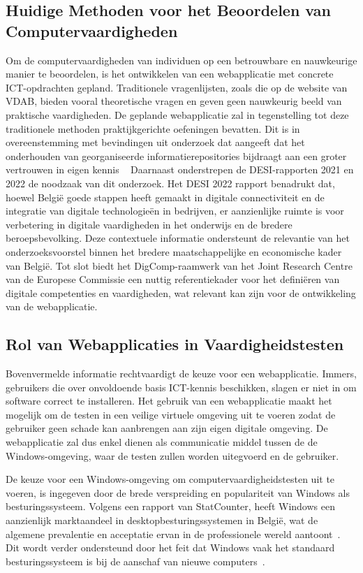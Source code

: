 \subsection{Huidige Methoden voor het Beoordelen van Computervaardigheden}
Om de computervaardigheden van individuen op een betrouwbare en nauwkeurige manier te beoordelen, is het ontwikkelen van een webapplicatie met concrete ICT-opdrachten gepland. Traditionele vragenlijsten, zoals die op de website van VDAB, bieden vooral theoretische vragen en geven geen nauwkeurig beeld van praktische vaardigheden.
De geplande webapplicatie zal in tegenstelling tot deze traditionele methoden praktijkgerichte oefeningen bevatten. Dit is in overeenstemming met bevindingen uit onderzoek dat aangeeft dat het onderhouden van georganiseerde informatierepositories bijdraagt aan een groter vertrouwen in eigen kennis ~\textcite{JudgingKnowledge}
Daarnaast onderstrepen de DESI-rapporten 2021 en 2022 de noodzaak van dit onderzoek. Het DESI 2022 rapport benadrukt dat, hoewel België goede stappen heeft gemaakt in digitale connectiviteit en de integratie van digitale technologieën in bedrijven, er aanzienlijke ruimte is voor verbetering in digitale vaardigheden in het onderwijs en de bredere beroepsbevolking. Deze contextuele informatie ondersteunt de relevantie van het onderzoeksvoorstel binnen het bredere maatschappelijke en economische kader van België.
Tot slot biedt het DigComp-raamwerk van het Joint Research Centre van de Europese Commissie een nuttig referentiekader voor het definiëren van digitale competenties en vaardigheden, wat relevant kan zijn voor de ontwikkeling van de webapplicatie. ~\textcite{DigCompFramework}

\subsection{Rol van Webapplicaties in Vaardigheidstesten}
Bovenvermelde informatie rechtvaardigt de ke\-uze voor een webapplicatie. Immers, gebruikers die over onvoldoende basis ICT-kennis beschikken, slagen er niet in om software correct te installeren. Het gebruik van een webapplicatie maakt het mogelijk om de testen in een veilige virtuele omgeving uit te voeren zodat de gebruiker geen schade kan aanbrengen aan zijn eigen digitale omgeving. De webapplicatie zal dus enkel dienen als communicatie middel tussen de de Windows-omgeving, waar de testen zullen worden uitegvoerd en de gebruiker.

De keuze voor een Windows-omgeving om computervaardigheidstesten uit te voeren, is ingegeven door de brede verspreiding en populariteit van Windows als besturingssysteem. Volgens een rapport van StatCounter, heeft Windows een aanzienlijk marktaandeel in desktopbesturingssystemen in België, wat de algemene prevalentie en acceptatie ervan in de professionele wereld aantoont~\autocite{StatCounterOSMarketShare}. Dit wordt verder ondersteund door het feit dat Windows vaak het standaard besturingssysteem is bij de aanschaf van nieuwe computers~\autocite{ProfolusWindowsPopularity}.

